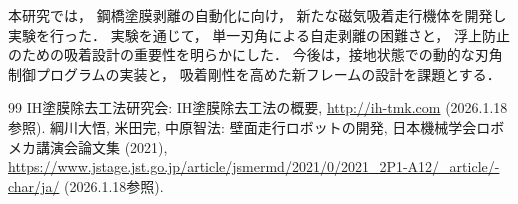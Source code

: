 \documentclass[10pt]{jarticle}
\begin{document}
本研究では，
鋼橋塗膜剥離の自動化に向け，
新たな磁気吸着走行機体を開発し実験を行った．
実験を通じて，
単一刃角による自走剥離の困難さと，
浮上防止のための吸着設計の重要性を明らかにした．
今後は，接地状態での動的な刃角制御プログラムの実装と，
吸着剛性を高めた新フレームの設計を課題とする．

\vspace{5mm} { 
\footnotesize 
\begin{thebibliography}{99} 
\setlength{\itemsep}{-2pt} 
 IH塗膜除去工法研究会: IH塗膜除去工法の概要, 
\url{http://ih-tmk.com} (2026.1.18参照).
 綱川大悟, 米田完, 中原智法: 壁面走行ロボットの開発, 日本機械学会ロボメカ講演会論文集 (2021), 
\url{https://www.jstage.jst.go.jp/article/jsmermd/2021/0/2021_2P1-A12/_article/-char/ja/} (2026.1.18参照).
\end{thebibliography} }
\normalsize
\end{document}
